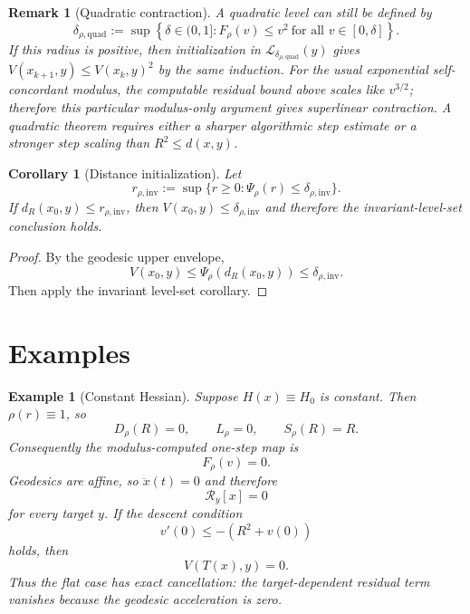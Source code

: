 \documentclass[11pt]{article}
\newtheorem{example}{Example}
\newtheorem{corollary}{Corollary}
\newtheorem{remark}{Remark}
\begin{document}
\begin{remark}[Quadratic contraction]
A quadratic level can still be defined by
\[
    \delta_{\rho,\mathrm{quad}}
    :=
    \sup\left\{
        \delta\in(0,1]:
        F_\rho(v)\le v^2
        \ \text{for all }v\in[0,\delta]
    \right\}.
\]
If this radius is positive, then initialization in $\mathcal L_{\delta_{\rho,\mathrm{quad}}}(y)$
gives $V(x_{k+1},y)\le V(x_k,y)^2$ by the same induction.  For the usual exponential
self-concordant modulus, the computable residual bound above scales like $v^{3/2}$;
therefore this particular modulus-only argument gives superlinear contraction.  A
quadratic theorem requires either a sharper algorithmic step estimate or a stronger
step scaling than $R^2\le d(x,y)$.
\end{remark}

\begin{corollary}[Distance initialization]
Let
\[
    r_{\rho,\mathrm{inv}}
    :=
    \sup\{r\ge0:\Psi_\rho(r)\le \delta_{\rho,\mathrm{inv}}\}.
\]
If $d_R(x_0,y)\le r_{\rho,\mathrm{inv}}$, then $V(x_0,y)\le\delta_{\rho,\mathrm{inv}}$ and
therefore the invariant-level-set conclusion holds.
\end{corollary}

\begin{proof}
By the geodesic upper envelope,
\[
    V(x_0,y)\le\Psi_\rho(d_R(x_0,y))\le\delta_{\rho,\mathrm{inv}}.
\]
Then apply the invariant level-set corollary.
\end{proof}

\section{Examples}

\begin{example}[Constant Hessian]
Suppose $H(x)\equiv H_0$ is constant. Then $\rho(r)\equiv1$, so
\[
    D_\rho(R)=0,
    \qquad
    L_\rho=0,
    \qquad
    S_\rho(R)=R.
\]
Consequently the modulus-computed one-step map is
\[
    F_\rho(v)=0.
\]
Geodesics are affine, so $\ddot x(t)=0$ and therefore
\[
    \mathcal R_y[x]=0
\]
for every target $y$. If the descent condition
\[
    v'(0)\le -(R^2+v(0))
\]
holds, then
\[
    V(T(x),y)=0.
\]
Thus the flat case has exact cancellation: the target-dependent residual term vanishes because the geodesic acceleration is zero.
\end{example}
\end{document}

